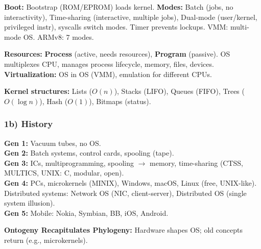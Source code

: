 \textbf{Boot:} Bootstrap (ROM/EPROM) loads kernel. \textbf{Modes:} Batch (jobs, no interactivity), Time-sharing (interactive, multiple jobs), Dual-mode (user/kernel, privileged instr), syscalls switch modes. Timer prevents lockups. VMM: multi-mode OS. ARMv8: 7 modes.

\textbf{Resources:} \textbf{Process} (active, needs resources), \textbf{Program} (passive). OS multiplexes CPU, manages process lifecycle, memory, files, devices. \textbf{Virtualization:} OS in OS (VMM), emulation for different CPUs.

\textbf{Kernel structures:} Lists ($O(n)$), Stacks (LIFO), Queues (FIFO), Trees ($O(\log n)$), Hash ($O(1)$), Bitmaps (status).

\subsubsection*{1b) History}

\textbf{Gen 1:} Vacuum tubes, no OS.\\
\textbf{Gen 2:} Batch systems, control cards, spooling (tape).\\
\textbf{Gen 3:} ICs, multiprogramming, spooling $\rightarrow$ memory, time-sharing (CTSS, MULTICS, UNIX: C, modular, open).\\
\textbf{Gen 4:} PCs, microkernels (MINIX), Windows, macOS, Linux (free, UNIX-like). Distributed systems: Network OS (NIC, client-server), Distributed OS (single system illusion).\\
\textbf{Gen 5:} Mobile: Nokia, Symbian, BB, iOS, Android.

\textbf{Ontogeny Recapitulates Phylogeny:} Hardware shapes OS; old concepts return (e.g., microkernels).